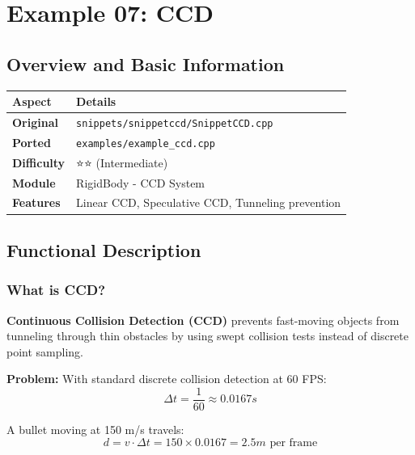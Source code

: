 
\section{Example 07: CCD}

\subsection{Overview and Basic Information}

\begin{table}[h]
\centering
\begin{tabular}{|l|l|}
\hline
\textbf{Aspect} & \textbf{Details} \\
\hline
\textbf{Original} & \texttt{snippets/snippetccd/SnippetCCD.cpp} \\
\textbf{Ported} & \texttt{examples/example\_ccd.cpp} \\
\textbf{Difficulty} & ⭐⭐ (Intermediate) \\
\textbf{Module} & RigidBody - CCD System \\
\textbf{Features} & Linear CCD, Speculative CCD, Tunneling prevention \\
\hline
\end{tabular}
\end{table}

\subsection{Functional Description}

\subsubsection{What is CCD?}

\textbf{Continuous Collision Detection (CCD)} prevents fast-moving objects from tunneling through thin obstacles by using swept collision tests instead of discrete point sampling.

\textbf{Problem:} With standard discrete collision detection at 60 FPS:
\begin{equation}
\Delta t = \frac{1}{60} \approx 0.0167s
\end{equation}

A bullet moving at 150 m/s travels:
\begin{equation}
d = v \cdot \Delta t = 150 \times 0.0167 = 2.5m \text{ per frame}
\end{equation}

